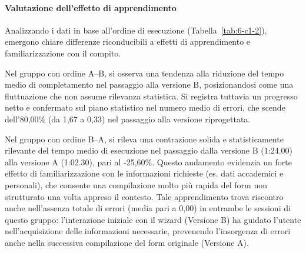 \paragraph{Valutazione dell'effetto di apprendimento}

Analizzando i dati in base all'ordine di esecuzione (Tabella~\ref{tab:6-c1-2}), emergono chiare differenze riconducibili a effetti di apprendimento e familiarizzazione con il compito.

Nel gruppo con ordine A--B, si osserva una tendenza alla riduzione del tempo medio di completamento nel passaggio alla versione B, posizionandosi come una fluttuazione che non assume rilevanza statistica. Si registra tuttavia un progresso netto e confermato sul piano statistico nel numero medio di errori, che scende dell'80,00\% (da 1,67 a 0,33) nel passaggio alla versione riprogettata.

Nel gruppo con ordine B--A, si rileva una contrazione solida e statisticamente rilevante del tempo medio di esecuzione nel passaggio dalla versione B (1:24.00) alla versione A (1:02.30), pari al -25,60\%. Questo andamento evidenzia un forte effetto di familiarizzazione con le informazioni richieste (es. dati accademici e personali), che consente una compilazione molto più rapida del form non strutturato una volta appreso il contesto. Tale apprendimento trova riscontro anche nell'assenza totale di errori (media pari a 0,00) in entrambe le sessioni di questo gruppo: l'interazione iniziale con il wizard (Versione B) ha guidato l'utente nell'acquisizione delle informazioni necessarie, prevenendo l'insorgenza di errori anche nella successiva compilazione del form originale (Versione A).

